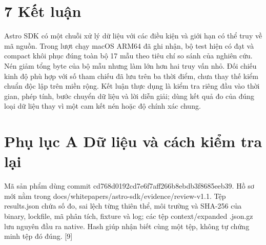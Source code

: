 \documentclass[11pt,a4paper]{article}
\begin{document}
\section*{7 Kết luận}
Astro SDK có một chuỗi xử lý dữ liệu với các điều kiện và giới hạn có thể truy về mã nguồn. Trong lượt chạy macOS ARM64 đã ghi nhận, bộ test hiện có đạt và compact khôi phục đúng toàn bộ 17 mẫu theo tiêu chí so sánh của nghiên cứu. Nén giảm tổng byte của bộ mẫu nhưng làm lớn hơn hai truy vấn nhỏ. Đối chiếu kinh độ phù hợp với số tham chiếu đã lưu trên ba thời điểm, chưa thay thế kiểm chuẩn độc lập trên miền rộng. Kết luận thực dụng là kiểm tra riêng đầu vào thời gian, phép tính, bước chuyển dữ liệu và lời diễn giải; dùng kết quả đo của đúng loại dữ liệu thay vì một cam kết nén hoặc độ chính xác chung.


\section*{Phụ lục A Dữ liệu và cách kiểm tra lại}
Mã sản phẩm dùng commit cd768d0192\allowbreak{}cd7e6f7aff\allowbreak{}266b8ebdb3\allowbreak{}f8685eeb39. Hồ sơ mới nằm trong docs/\allowbreak{}whitepapers/\allowbreak{}astro-sdk/\allowbreak{}evidence/\allowbreak{}review-v1.1. Tệp results.json chứa số đo, sai lệch từng thiên thể, môi trường và SHA-256 của binary, lockfile, mã phân tích, fixture và log; các tệp context/\allowbreak{}expanded .json.gz lưu nguyên đầu ra native. Hash giúp nhận biết cùng một tệp, không tự chứng minh tệp đó đúng. [9]
\end{document}
